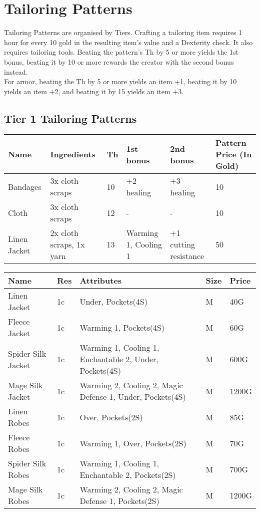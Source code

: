 \section{Tailoring Patterns}\label{sec:tailoringPatterns}
Tailoring Patterns are organised by Tiers.
Crafting a tailoring item requires 1 hour for every 10 gold in the resulting item's value and a Dexterity check.
It also requires tailoring tools.
Beating the pattern's Th by 5 or more yields the 1st bonus, beating it by 10 or more rewards the creator with the second bonus instead.\\
For armor, beating the Th by 5 or more yields an item +1, beating it by 10 yields an item +2, and beating it by 15 yields an item +3.\\
	
\subsection{Tier 1 Tailoring Patterns}
\begin{longtable}{p{1.5cm} | p{2.5cm} | l | p{2cm} | p{2cm} | p{1cm} }
	Name & Ingredients & Th  & 1st bonus & 2nd bonus & Pattern Price (In Gold)\\ \hline
	Bandages & 3x cloth scraps & 10 & +2 healing & +3 healing & 10\\
	Cloth & 3x cloth scraps & 12 & - & - & 10\\
	Linen Jacket & 2x cloth scraps, 1x yarn & 13 & Warming 1, Cooling 1 & +1 cutting resistance & 50\\
\end{longtable}

\begin{longtable}{p{3cm} | p{1.5cm} | p{5cm} | p{1cm} | p{1.5cm}}
	Name & Res &   Attributes & Size & Price\\ \hline

	Linen Jacket & 1c & Under, Pockets(4S) & M & 40G\\

	Fleece Jacket & 1c & Warming 1, Pockets(4S) & M & 60G\\

	Spider Silk Jacket & 1c & Warming 1, Cooling 1, Enchantable 2, Under, Pockets(4S) & M & 600G\\

	Mage Silk Jacket & 1c & Warming 2, Cooling 2, Magic Defense 1, Under, Pockets(4S) & M & 1200G\\

	Linen Robes & 1c & Over, Pockets(2S) & M & 85G\\

	Fleece Robes & 1c & Warming 1, Over, Pockets(2S)  & M & 70G\\

	Spider Silk Robes & 1c & Warming 1, Cooling 1, Enchantable 2, Pockets(2S)  & M & 700G\\

	Mage Silk Robes & 1c & Warming 2, Cooling 2, Magic Defense 1, Pockets(2S)  & M & 1200G\\
\end{longtable}

